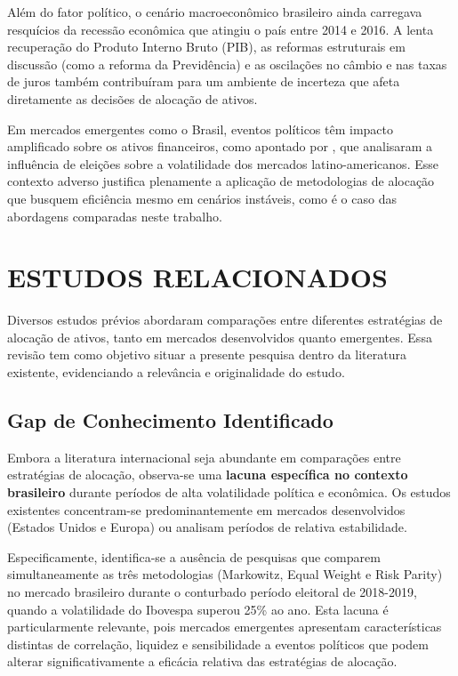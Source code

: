 Além do fator político, o cenário macroeconômico brasileiro ainda carregava resquícios da recessão econômica que atingiu o país entre 2014 e 2016. A lenta recuperação do Produto Interno Bruto (PIB), as reformas estruturais em discussão (como a reforma da Previdência) e as oscilações no câmbio e nas taxas de juros também contribuíram para um ambiente de incerteza que afeta diretamente as decisões de alocação de ativos.

Em mercados emergentes como o Brasil, eventos políticos têm impacto amplificado sobre os ativos financeiros, como apontado por \cite{carnahan2020electoral}, que analisaram a influência de eleições sobre a volatilidade dos mercados latino-americanos. Esse contexto adverso justifica plenamente a aplicação de metodologias de alocação que busquem eficiência mesmo em cenários instáveis, como é o caso das abordagens comparadas neste trabalho.

\section{ESTUDOS RELACIONADOS}

Diversos estudos prévios abordaram comparações entre diferentes estratégias de alocação de ativos, tanto em mercados desenvolvidos quanto emergentes. Essa revisão tem como objetivo situar a presente pesquisa dentro da literatura existente, evidenciando a relevância e originalidade do estudo.

\subsection{Gap de Conhecimento Identificado}

Embora a literatura internacional seja abundante em comparações entre estratégias de alocação, observa-se uma \textbf{lacuna específica no contexto brasileiro} durante períodos de alta volatilidade política e econômica. Os estudos existentes concentram-se predominantemente em mercados desenvolvidos (Estados Unidos e Europa) ou analisam períodos de relativa estabilidade. 

Especificamente, identifica-se a ausência de pesquisas que comparem simultaneamente as três metodologias (Markowitz, Equal Weight e Risk Parity) no mercado brasileiro durante o conturbado período eleitoral de 2018-2019, quando a volatilidade do Ibovespa superou 25\% ao ano. Esta lacuna é particularmente relevante, pois mercados emergentes apresentam características distintas de correlação, liquidez e sensibilidade a eventos políticos que podem alterar significativamente a eficácia relativa das estratégias de alocação.

